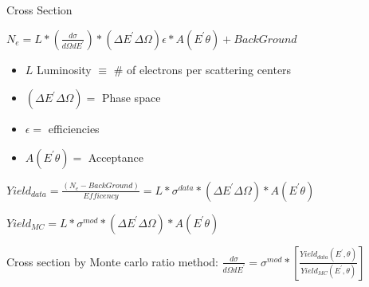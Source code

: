 \documentclass{beamer}
\begin{document}
\begin{frame}{Cross Section}
	\begin{block}{}
		\centering
		 $N_e = \textit{L} * \left( \frac{d\sigma}{d\Omega dE^\prime} \right) * \left( \Delta E^\prime \Delta \Omega\right) \epsilon * A \left(E^\prime \theta \right)  + Back  Ground$
		
		\begin{itemize}
			\item $\textit{L}$ Luminosity $\equiv$ \# of electrons per scattering centers
			\item $\left( \Delta E^\prime \Delta \Omega\right) = $ Phase space
			\item $\epsilon = $ efficiencies
			\item  $A \left(E^\prime \theta \right) =$ Acceptance 
			
		\end{itemize}
		
		$ Yield_{data} = \frac{\left(N_e - BackGround\right)}{Efficency } =  \textit{L} *\sigma^{data} * \left( \Delta E^\prime \Delta \Omega\right)*  A \left(E^\prime \theta \right)$
		
		$ Yield_{MC} = \textit{L} *\sigma^{mod} * \left( \Delta E^\prime \Delta \Omega\right)*  A \left(E^\prime \theta \right)$
	\end{block}



	\begin{center}

	\begin{block}{}
		Cross section by Monte carlo ratio  method:
\centering $ \frac{d\sigma}{d\Omega dE^\prime} = \sigma^{mod} * \left[\frac{Yield_{data} \left( 
E^\prime,\theta\right)} {Yield_{MC}\left(E^\prime,\theta\right)}\right] $

	\end{block}	
	\end{center}



\end{frame}
\begin{frame}

\end{frame}
\end{document}
